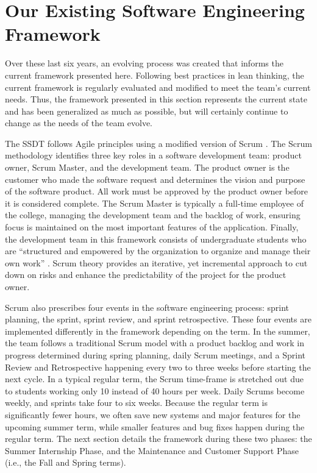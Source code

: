 \section{Our Existing Software Engineering Framework}

Over these last six years, an evolving process was created that informs the current framework presented here. Following best practices in lean thinking, the current framework is regularly evaluated and modified to meet the team's current needs. Thus, the framework presented in this section represents the current state and has been generalized as much as possible, but will certainly continue to change as the needs of the team evolve.

The SSDT follows Agile principles \cite{agilemanifesto} using a modified version of Scrum \cite{thescrumguide}. The Scrum methodology identifies three key roles in a software development team: product owner, Scrum Master, and the development team. The product owner is the customer who made the software request and determines the vision and purpose of the software product. All work must be approved by the product owner before it is considered complete. The Scrum Master is typically a full-time employee of the college, managing the development team and the backlog of work, ensuring focus is maintained on the most important features of the application. Finally, the development team in this framework consists of undergraduate students who are ``structured and empowered by the organization to organize and manage their own work'' \cite{thescrumguide}. Scrum theory provides an iterative, yet incremental approach to cut down on risks and enhance the predictability of the project for the product owner.

Scrum also prescribes four events in the software engineering process: sprint planning, the sprint, sprint review, and sprint retrospective. These four events are implemented differently in the framework depending on the term. In the summer, the team follows a traditional Scrum model with a product backlog and work in progress determined during spring planning, daily Scrum meetings, and a Sprint Review and Retrospective happening every two to three weeks before starting the next cycle. In a typical regular term, the Scrum time-frame is stretched out due to students working only 10 instead of 40 hours per week. Daily Scrums become weekly, and sprints take four to six weeks. Because the regular term is significantly fewer hours, we often save new systems and major features for the upcoming summer term, while smaller features and bug fixes happen during the regular term. The next section details the framework during these two phases: the Summer Internship Phase, and the Maintenance and Customer Support Phase (i.e., the Fall and Spring terms).

